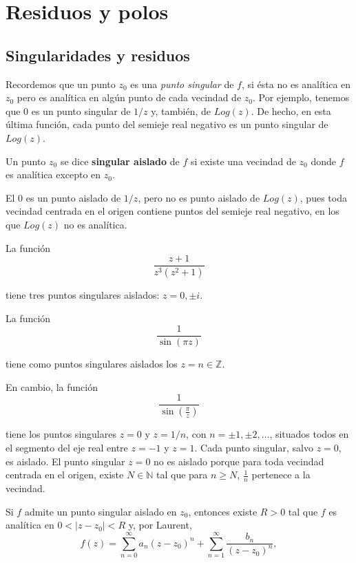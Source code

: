 \chapter{Residuos y polos}

\section{Singularidades y residuos}

Recordemos que un punto $z_0$ es una \textit{punto singular} de $f$, si ésta no es analítica en $z_0$ pero es analítica en algún punto de cada vecindad de $z_0$. Por ejemplo, tenemos que 0 es un punto singular de $1/z$ y, también, de $Log(z)$. De hecho, en esta última función, cada punto del semieje real negativo es un punto singular de $Log(z)$.

\begin{defi}
Un punto $z_0$ se dice \textbf{singular aislado} de $f$ si existe una vecindad de $z_0$ donde $f$ es analítica excepto en $z_0$.
\end{defi}

\begin{ejemplo}
El 0 es un punto aislado de $1/z$, pero no es punto aislado de $Log(z)$, pues toda vecindad centrada en el origen contiene puntos del semieje real negativo, en los que $Log(z)$ no es analítica.
\end{ejemplo}

\begin{ejemplo}
La función
$$\frac{z+1}{z^3(z^2+1)}$$

tiene tres puntos singulares aislados: $z = 0, \pm i$.
\end{ejemplo}

\begin{ejemplo}
La función 
$$\frac{1}{\sin(\pi z)}$$

tiene como puntos singulares aislados los $z = n \in \mathbb{Z}$.

En cambio, la función
$$\frac{1}{\sin\left( \frac{\pi}{z} \right)}$$

tiene los puntos singulares $z = 0$ y $z = 1/n$, con $n = \pm 1, \pm 2, \dots$, situados todos en el segmento del eje real entre $z = -1$ y $z = 1$. Cada punto singular, salvo $z = 0$, es aislado. El punto singular $z = 0$ no es aislado porque para toda vecindad centrada en el origen, existe $N \in \mathbb{N}$ tal que para $n \geq N$, $\frac{1}{n}$ pertenece a la vecindad.
\end{ejemplo}

Si $f$ admite un punto singular aislado en $z_0$, entonces existe $R > 0$ tal que $f$ es analítica en $0 < |z-z_0| < R$ y, por Laurent,
$$f(z) = \sum_{n=0}^{\infty} a_n (z-z_0)^n + \sum_{n=1}^{\infty} \frac{b_n}{(z-z_0)^n},$$

